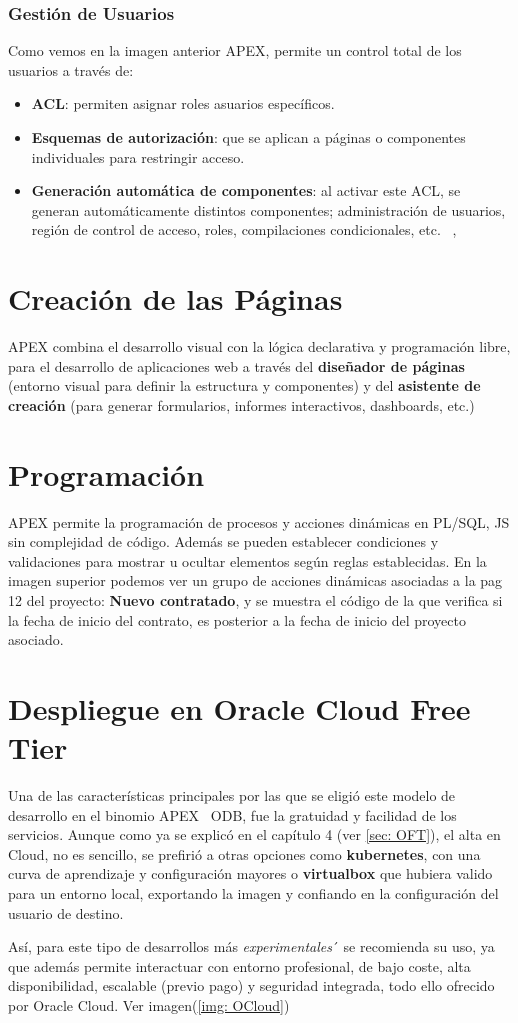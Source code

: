 \subsubsection{Gestión de Usuarios}
Como vemos en la imagen anterior \acrshort{APEX}, permite un control total de los usuarios a través de:
\begin{itemize}
	\item \textbf{\acrfull{ACL}}: permiten asignar roles asuarios específicos.
	\item \textbf{Esquemas de autorización}: que se aplican a páginas o componentes individuales para restringir acceso.
	\item \textbf{Generación automática de componentes}: al activar este \acrshort{ACL}, se generan automáticamente distintos componentes; administración de usuarios, región de control de acceso, roles, compilaciones condicionales, etc. ~\cite{OracleAPEXApp}, \cite{OracleAPEXAdministration}
\end{itemize}
\section{Creación de las Páginas}
\acrshort{APEX} combina el desarrollo visual con la lógica declarativa y programación libre, para el desarrollo de aplicaciones web a través del \textbf{diseñador de páginas} (entorno visual para definir la estructura y componentes) y del \textbf{asistente de creación} (para generar formularios, informes interactivos, dashboards, etc.)
\section{Programación}
\acrshort{APEX} permite la programación de procesos y acciones dinámicas en \acrshort{PL/SQL}, \acrshort{JS} sin complejidad de código.
Además se pueden establecer condiciones y validaciones para mostrar u ocultar elementos según reglas establecidas.
En la imagen superior podemos ver un grupo de acciones dinámicas asociadas a la pag 12 del proyecto: \textbf{Nuevo contratado}, y se muestra el código de la que verifica si la fecha de inicio del contrato, es posterior a la fecha de inicio del proyecto asociado.
\section{Despliegue en Oracle Cloud Free Tier}
Una de las características principales por las que se eligió este modelo de desarrollo en el binomio \acrshort{APEX} \ \acrshort{ODB}, fue la gratuidad y facilidad de los servicios. Aunque como ya se explicó en el capítulo 4 (ver \ref{sec: OFT}), el alta en Cloud, no es sencillo, se prefirió a otras opciones como \textbf{kubernetes}, con una curva de aprendizaje y configuración mayores o \textbf{virtualbox} que hubiera valido para un entorno local, exportando la imagen y confiando en la configuración del usuario de destino.

Así, para este tipo de desarrollos más \textit{experimentales}´ se recomienda su uso, ya que además permite interactuar con entorno profesional, de bajo coste, alta disponibilidad, escalable (previo pago) y seguridad integrada, todo ello ofrecido por Oracle Cloud. Ver imagen(\ref{img: OCloud})


